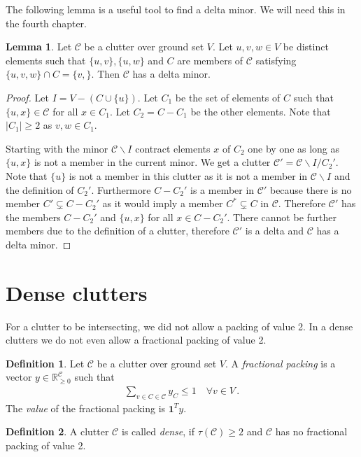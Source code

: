 \documentclass[a4paper, 12pt]{scrbook}
\theoremstyle{definition}
\newtheorem*{definition}{Definition}
\newtheorem{lemma}[theorem]{Lemma}
\newcommand*{\IR}{\ensuremath{\mathbb{R}}}
\begin{document}
The following lemma is a useful tool to find a delta minor. We will need this in the fourth chapter.
\begin{lemma}
    Let $\mathcal{C}$ be a clutter over ground set $V$. Let $u,v,w \in V$ be distinct elements such that $\{u,v\}, \{u,w\}$ and $C$ are members of $\mathcal{C}$ satisfying $\{u,v,w\}\cap C = \{v,\}$. Then $\mathcal{C}$ has a delta minor.
\end{lemma}

\begin{proof}\label{finddelta}
    Let $I=V-(C \cup \{u\})$. Let $C_1$ be the set of elements of $C$ such that $\{u,x\} \in \mathcal{C}$ for all $x \in C_1$. Let $C_2=C-C_1$ be the other elements. Note that $|C_1|\geq 2$ as $v,w \in C_1$.

    Starting with the minor $\mathcal{C} \backslash I$ contract elements $x$ of $C_2$ one by one as long as $\{u,x\}$ is not a member in the current minor.
    We get a clutter $\mathcal{C'}=\mathcal{C} \backslash I/C_2'$.
    Note that $\{u\}$ is not a member in this clutter as it is not a member in $\mathcal{C} \backslash I$ and the definition of $C_2'$.
    Furthermore $C-C_2'$ is a member in $\mathcal{C'}$ because there is no member $C' \subsetneq C-C_2'$ as it would imply a member $C^* \subsetneq C$ in $\mathcal{C}$.
    Therefore $\mathcal{C'}$ has the members $C-C_2'$ and $\{u,x\}$ for all $x \in C-C_2'$. There cannot be further members due to the definition of a clutter, therefore $\mathcal{C'}$ is a delta and $\mathcal{C}$ has a delta minor.

\end{proof}


\section{Dense clutters}
For a clutter to be intersecting, we did not allow a packing of value 2. In a dense clutters we do not even allow a fractional packing of value 2.
\begin{definition}
    Let $\mathcal{C}$ be a clutter over ground set $V$.
    A \emph{fractional packing} is a vector $y \in \IR_{\geq0}^{\mathcal{C}}$ such that
    \begin{align*}
        \sum_{v \in C \in \mathcal{C}} y_C \leq 1 \quad \forall v \in V \,.
    \end{align*}
    The \emph{value} of the fractional packing is $\textbf{1}^Ty$.
\end{definition}
\begin{definition}
    A clutter $\mathcal{C}$ is called \emph{dense}, if $\tau(\mathcal{C}) \geq 2$ and $\mathcal{C}$ has no fractional packing of value 2.
\end{definition}
\end{document}
